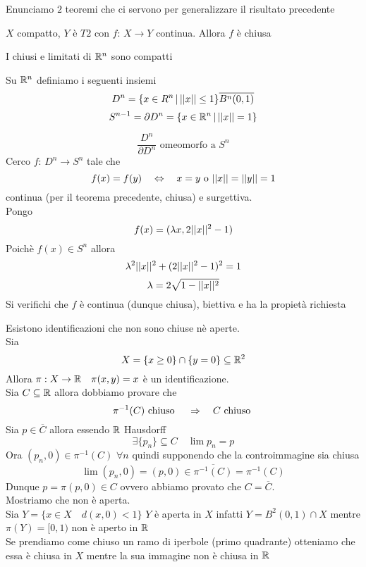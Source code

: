 \spazio
Enunciamo $2$ teoremi che ci servono per generalizzare il risultato precedente
\begin{thm} $X$ compatto, $Y$ \`e $T2$ con $f:\, X \to Y$ continua. Allora $f$ \`e chiusa
\end{thm}
\begin{thm}I chiusi e limitati di $\mathbb{R}^n$ sono compatti
\end{thm}
\begin{defn}Su $\mathbb{R}^n$ definiamo i seguenti insiemi
$$ D^n = \{ x \in R^n \, \vert \, \vert \vert x \vert \vert  \leq 1 \} \overline{B^n(0,1)}$$
$$ S^{n-1} =\partial D^n = \{ x \in \mathbb{R}^n \, \vert \, \vert \vert x \vert \vert =1 \}$$
\end{defn}

\begin{thm}
$$ \frac{D^n}{\partial D^n} \text{ omeomorfo a } S^n$$
\proof Cerco $f:\, D^n \to S^n $ tale che
$$ f(x)=f(y) \quad \Leftrightarrow \quad x=y \text{ o } \vert \vert x \vert \vert = \vert \vert y \vert \vert =1 $$
continua (per il teorema precedente, chiusa) e surgettiva.\\
Pongo
$$ f(x) = ( \lambda x , 2  \vert \vert x \vert \vert ^2 -1 ) $$
Poich\`e $f(x)\in S^n$ allora
$$\lambda^2 \vert \vert x \vert \vert ^2 + ( 2\vert \vert x \vert \vert ^2 -1) ^2 = 1  $$
$$ \lambda = 2 \sqrt{ 1 - \vert \vert x \vert \vert ^2 }$$
Si verifichi che $f$ \`e continua (dunque chiusa), biettiva e ha la propiet\`a richiesta
\end{thm}
\spazio
\begin{oss}Esistono identificazioni che non sono chiuse n\`e aperte.\\
Sia  $$ X =\{ x \geq 0  \} \cap \{ y =0 \}  \subseteq \mathbb{R}^2 $$
Allora $\pi:X \to \mathbb{R} \quad \pi(x,y)= x$ \`e un identificazione.\\
Sia $ C \subseteq \mathbb{R}$  allora dobbiamo provare che 
$$ \pi^{-1} ( C) \text{ chiuso } \quad \Rightarrow  \quad C \text{ chiuso } $$
Sia $p \in \overline{C}$ allora essendo $\mathbb{R}$ Hausdorff 
$$ \exists \{ p_n \}\subseteq C \quad \lim p_n = p $$
Ora $(p_n, 0 ) \in \pi^{-1}(C) $ $\forall n $ quindi supponendo che la controimmagine sia chiusa
$$ \lim (p_n , 0 ) = (p,0) \in \overline{\pi^{-1}(C)} =\pi^{-1}(C)$$
Dunque $p=\pi(p,0) \in C$ ovvero abbiamo provato che $C=\overline{C}$.\\
Mostriamo che non \`e aperta.\\
Sia  $ Y = \{ x \in X \quad d( x,0)<1 \}$ $Y$ \`e aperta in $X$ infatti 
$Y = B^2(0,1) \cap X $ mentre $\pi(Y) =[0,1)$ non \`e aperto in $\mathbb{R}$\\
Se prendiamo come chiuso un ramo di iperbole (primo quadrante) otteniamo che essa \`e chiusa in $X$ mentre la sua immagine non \`e chiusa in $\mathbb{R}$
\end{oss}

